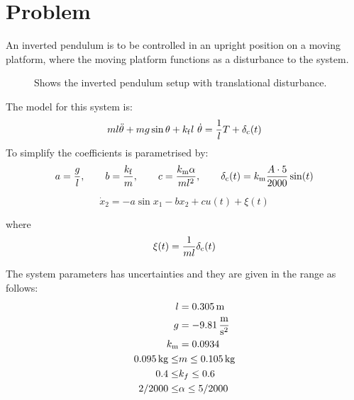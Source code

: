 \chapter{Problem}
An inverted pendulum is to be controlled in an upright position on a moving platform, where the moving platform functions as a disturbance to the system.
\begin{figure}[H]
        \centering
        \def\svgwidth{10cm}
        
        \caption{Shows the inverted pendulum setup with translational disturbance.}
        \label{fig:}
\end{figure}
The model for this system is:
\begin{equation}
        m l \Ddot{\theta} + m g \sin\theta + k_{\mathrm{f}}  l \ \dot{\theta} = \frac{1}{l}T + \delta_{\mathrm{c}}(t)
\end{equation}
To simplify the coefficients is parametrised by:
\begin{equation}
        a=\frac{g}{l}, \qquad b=\frac{k_{\mathrm{f}}}{m}, \qquad c= \frac{k_{\mathrm{m}}\alpha}{m l^2}, \qquad \delta_{\mathrm{c}}(t) = k_{\mathrm{m}} \frac{A\cdot5}{2000}\sin(t)
\end{equation}

\begin{equation}
        \dot{x}_2 = - a \sin x_1 - b x_2 + c u(t) + \xi(t)
\end{equation}

where
\begin{equation}
        \xi(t) = \frac{1}{m l} \delta_{\mathrm{c}}(t)
\end{equation}

The system parameters has uncertainties and they are given in the range as follows:
\begin{equation}
        \begin{split}
                l &= 0.305 \, \mathrm{m} \\
                g &= -9.81 \, \frac{\mathrm{m}}{\mathrm{s}^2}\\
                k_{\mathrm{m}} &= 0.0934 \\
                0.095 \, \text{kg} \leq & m \leq 0.105 \, \text{kg} \\
                0.4 \leq & k_f \leq 0.6 \\
                2/2000 \leq & \alpha \leq 5/2000 \\
                \nonumber
        \end{split}
\end{equation}

